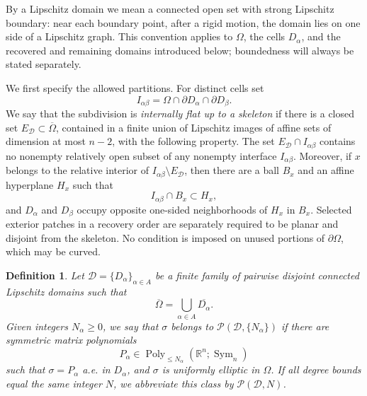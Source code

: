 \documentclass[11pt,oneside]{article}
\newtheorem{definition}[theorem]{Definition}
\newcommand{\R}{\mathbb R}
\newcommand{\Sym}{\operatorname{Sym}}
\begin{document}
By a Lipschitz domain we mean a connected open set with strong Lipschitz
boundary: near each boundary point, after a rigid motion, the domain lies on
one side of a Lipschitz graph.  This convention applies to \(\Omega\), the
cells \(D_\alpha\), and the recovered and remaining domains introduced below;
boundedness will always be stated separately.

We first specify the allowed partitions.  For distinct cells set
\begin{equation}
  I_{\alpha\beta}
  =\Omega\cap\partial D_\alpha\cap\partial D_\beta .
  \label{eq:clipped-cell-interface}
\end{equation}
We say that the subdivision is \emph{internally flat up to a skeleton} if there
is a closed set \(E_{\mathcal D}\subset\overline\Omega\), contained in a finite
union of Lipschitz images of affine sets of dimension at most \(n-2\), with the
following property.  The set \(E_{\mathcal D}\cap I_{\alpha\beta}\) contains no
nonempty relatively open subset of any nonempty interface
\(I_{\alpha\beta}\).  Moreover, if \(x\) belongs to the relative interior of
\(I_{\alpha\beta}\setminus E_{\mathcal D}\), then there are a ball \(B_x\) and
an affine hyperplane \(H_x\) such that
\begin{equation}
  I_{\alpha\beta}\cap B_x\subset H_x,
\end{equation}
and \(D_\alpha\) and \(D_\beta\) occupy opposite one-sided neighborhoods of
\(H_x\) in \(B_x\).  Selected exterior patches in a recovery order are
separately required to be planar and disjoint from the skeleton.  No condition
is imposed on unused portions of \(\partial\Omega\), which may be curved.

\begin{definition}
\label{def:piecewise-poly-class}
Let \(\mathcal D=\{D_\alpha\}_{\alpha\in A}\) be a finite family of pairwise
disjoint connected Lipschitz domains such that
\begin{equation}
  \overline\Omega=\bigcup_{\alpha\in A}\overline{D_\alpha}.
\end{equation}
Given integers \(N_\alpha\ge0\), we say that \(\sigma\) belongs to
\(\mathcal P(\mathcal D,\{N_\alpha\})\) if there are symmetric matrix
polynomials
\begin{equation}
  P_\alpha\in \operatorname{Poly}_{\le N_\alpha}(\R^n;\Sym_n)
\end{equation}
such that \(\sigma=P_\alpha\) a.e. in \(D_\alpha\), and \(\sigma\) is uniformly
elliptic in \(\Omega\).
If all degree bounds equal the same integer \(N\), we abbreviate this class by
\(\mathcal P(\mathcal D,N)\).
\end{definition}
\end{document}
